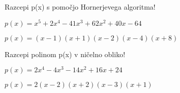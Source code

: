 \begin{vaja}
  Razcepi p(x) s pomočjo Hornerjevega algoritma!

$p(x)=x^5+2x^4-41x^3+62x^2+40x-64$

  \begin{odgovor}
    $p(x)=(x-1)(x+1)(x-2)(x-4)(x+8)$
  \end{odgovor}
\end{vaja}

\begin{vaja}
  Razcepi polinom p(x) v ničelno obliko!

$p(x)=2x^4-4x^3-14x^2+16x+24$


  \begin{odgovor}
    $p(x)=2(x-2)(x+2)(x-3)(x+1)$
  \end{odgovor}
\end{vaja}

